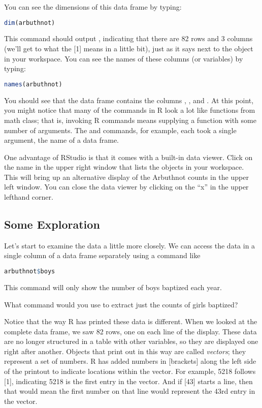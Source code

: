 \documentclass[11pt]{article}
\begin{document}
You can see the dimensions of this data frame by typing:

\begin{lstlisting}[language=R]
dim(arbuthnot)
\end{lstlisting}

This command should output , indicating that there are 82 rows and 3 columns (we'll get to what the [1] means in a little bit), just as it says next to the object in your workspace. You can see the names of these columns (or variables) by typing:

\begin{lstlisting}[language=R]
names(arbuthnot)
\end{lstlisting}

You should see that the data frame contains the columns , , and . At this point, you might notice that many of the commands in R look a lot like functions from math class; that is, invoking R commands means supplying a function with some number of arguments. The  and  commands, for example, each took a single argument, the name of a data frame. 

One advantage of RStudio is that it comes with a built-in data viewer. Click on the name  in the upper right window that lists the objects in your workspace. This will bring up an alternative display of the Arbuthnot counts in the upper left window. You can close the data viewer by clicking on the ``x'' in the upper lefthand corner. 


\subsection*{Some Exploration}
Let's start to examine the data a little more closely. We can access the data in a single column of a data frame separately using a command like

\begin{lstlisting}[language=R]
arbuthnot$boys
\end{lstlisting}

This command will only show the number of boys baptized each year.

\begin{exercise}
What command would you use to extract just the counts of girls baptized?
\end{exercise}

Notice that the way R has printed these data is different. When we looked at the complete data frame, we saw 82 rows, one on each line of the display. These data are no longer structured in a table with other variables, so they are displayed one right after another. Objects that print out in this way are called \emph{vectors}; they represent a set of numbers. R has added numbers in [brackets] along the left side of the printout to indicate locations within the vector. For example, 5218 follows [1], indicating 5218 is the first entry in the vector. And if [43] starts a line, then that would mean the first number on that line would represent the 43rd entry in the vector.
\end{document}
